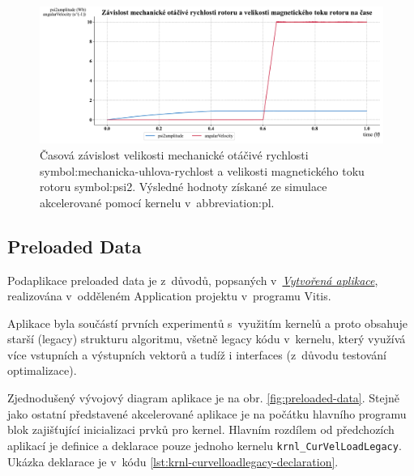 \documentclass[a4paper, twoside, 11pt]{article}
\newcommand{\fbar}{\FloatBarrier}
\begin{document}
		\begin{figure}[htbp!]
			\centering
			\includegraphics[width=1\textwidth]{src/pdf/k26-simulace-graf-mechanicka-rychlost-velikost-mg-toku-rotoru.pdf}
			\caption{Časová závislost velikosti mechanické otáčivé rychlosti \gls{symbol:mechanicka-uhlova-rychlost} a velikosti magnetického toku rotoru \gls{symbol:psi2}. Výsledné hodnoty získané ze simulace akcelerované pomocí kernelu v~\gls{abbreviation:pl}.}
			\label{fig:k26-simulace-graf-mechanicka-rychlost-velikost-mg-toku-rotoru}
		\end{figure}


		



	   \fbar
	   \subsection{Preloaded Data}\label{subsec:preloaded-data}
	   Podaplikace preloaded data je z~důvodů, popsaných v~\hyperref[sec:vytvorena-aplikace]{\textit{Vytvořená aplikace}}, realizována v~odděleném Application projektu v~programu Vitis.\par
	   Aplikace byla součástí prvních experimentů s~využitím kernelů a proto obsahuje starší (legacy) strukturu algoritmu, všetně legacy kódu v~kernelu, který využívá více vstupních a výstupních vektorů a tudíž i interfaces (z~důvodu testování optimalizace).\par
	   Zjednodušený vývojový diagram aplikace je na obr. \ref{fig:preloaded-data}. Stejně jako ostatní představené akcelerované aplikace je na počátku hlavního programu blok zajišťující inicializaci prvků pro kernel. Hlavním rozdílem od předchozích aplikací je definice a deklarace pouze jednoho kernelu \texttt{krnl\_CurVelLoadLegacy}. Ukázka deklarace je v~kódu \ref{lst:krnl-curvelloadlegacy-declaration}.\par
\end{document}
